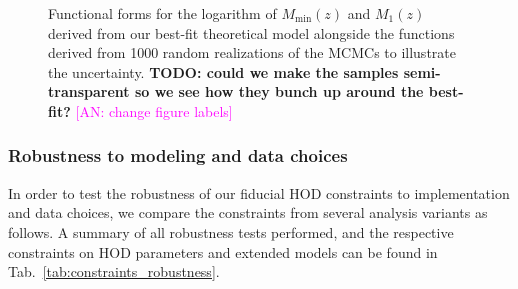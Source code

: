 \documentclass[a4paper,11pt]{article}
\newcommand{\todo}[1]{{\bf TODO: #1}}
\newcommand{\an}[1]{{\textcolor{magenta}{[AN: #1]}}}
\begin{document}
      \begin{figure}
        \begin{center}
          \caption{Functional forms for the logarithm of $M_{\mathrm{min}}(z)$ and $M_{1}(z)$ derived from our best-fit theoretical model alongside the functions derived from 1000 random realizations of the MCMCs to illustrate the uncertainty. \todo{could we make the samples semi-transparent so we see how they bunch up around the best-fit?} \an{change figure labels}} 
          \label{fig:hod-params-z-dep}
        \end{center}
      \end{figure}

    \subsubsection{Robustness to modeling and data choices}
      In order to test the robustness of our fiducial HOD constraints to implementation and data choices, we compare the constraints from several analysis variants as follows. A summary of all robustness tests performed, and the respective constraints on HOD parameters and extended models can be found in Tab.~\ref{tab:constraints_robustness}.
\end{document}

